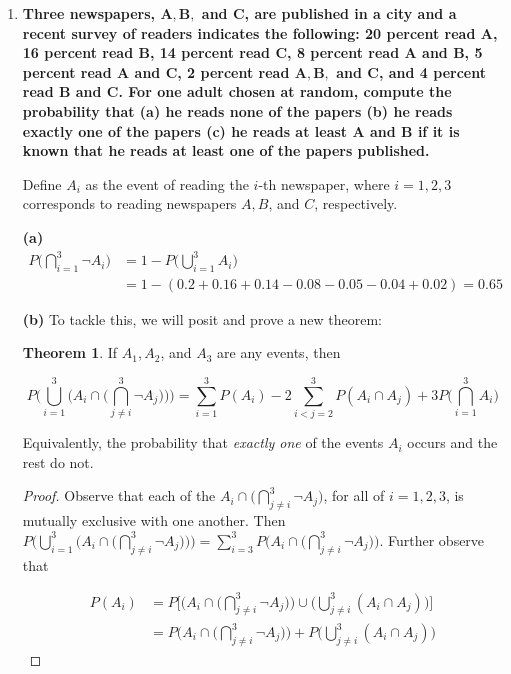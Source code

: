 \documentclass[10pt, oneside]{article}   	%
\theoremstyle{definition}
\newtheorem*{thm}{Theorem}
\begin{document}
\begin{enumerate}[label=3.\arabic*]
\item  \begin{tcolorbox}[
  colback=Cerulean!5!white,
  colframe=Cerulean!75!black]
\textbf{Three newspapers, $\bm{A, B,}$ and $\bm{C}$, are published in a city and a recent survey of readers indicates the following: 20 percent read $\bm{A}$, 16 percent read $\bm{B}$, 14 percent read $\bm{C}$, 8 percent read $\bm{A}$ and $\bm{B}$, 5 percent read $\bm{A}$ and $\bm{C}$, 2 percent read $\bm{A, B,}$ and $\bm{C}$, and 4 percent read $\bm{B}$ and $\bm{C}$. For one adult chosen at random, compute the probability that (a) he reads none of the papers (b) he reads exactly one of the papers (c) he reads at least $\bm{A}$ and $\bm{B}$ if it is known that he reads at least one of the papers published.}
\end{tcolorbox}

Define $A_i$ as the event of reading the $i$-th newspaper, where $i = 1, 2, 3$ corresponds to reading newspapers $A, B$, and $C$, respectively.

\textbf{(a)} 
\begin{align*}
P\Bigg( \bigcap^3_{i = 1} \neg A_i \Bigg) &= 1 - P \Bigg( \bigcup^3_{i = 1} A_i \Bigg) \\
&= 1 - (0.2 + 0.16 + 0.14 - 0.08 - 0.05 - 0.04 + 0.02) = \boxed{0.65}
\end{align*}

\textbf{(b)} To tackle this, we will posit and prove a new theorem:

\begin{thm}If $A_1, A_2$, and $A_3$ are any events, then

\[ P \Bigg( \bigcup^3_{i=1} \bigg( A_i  \cap \Big( \bigcap^3_{j \neq i} \neg A_j \Big) \bigg) \Bigg) = \sum^3_{i = 1} P(A_i) - 2 \sum^3_{i < j = 2} P(A_i \cap A_j) + 3 P\Bigg( \bigcap^3_{i=1} A_i \Bigg) \]

Equivalently, the probability that \textit{exactly one} of the events $A_i$ occurs and the rest do not.
\end{thm}

\begin{proof}Observe that each of the $A_i  \cap \Big( \bigcap^3_{j \neq i} \neg A_j \Big)$, for all of $i = 1, 2, 3$, is mutually exclusive with one another. Then $P \Bigg( \bigcup^3_{i=1} \bigg( A_i  \cap \Big( \bigcap^3_{j \neq i} \neg A_j \Big) \bigg) \Bigg) = \sum^3_{i = 3} P \Bigg( A_i  \cap \Big( \bigcap^3_{j \neq i} \neg A_j \Big) \Bigg)$. Further observe that

\begin{align*}
P(A_i) &= P\Bigg[ \Bigg( A_i  \cap \Big( \bigcap^3_{j \neq i} \neg A_j \Big) \Bigg) \cup \Bigg( \bigcup^3_{j \neq i} (A_i \cap A_j) \Bigg) \Bigg] \\
&= P\Bigg( A_i  \cap \Big( \bigcap^3_{j \neq i} \neg A_j \Big) \Bigg) + P \Bigg( \bigcup^3_{j \neq i} (A_i \cap A_j) \Bigg) 
\end{align*}


\end{proof}
\end{enumerate}
\end{document}
